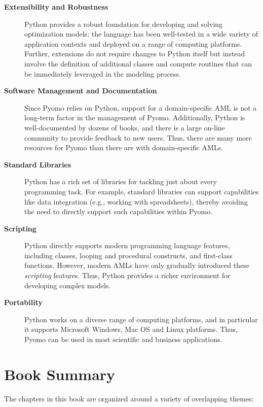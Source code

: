 \begin{description}

\item[{\bf Extensibility and Robustness}] Python provides a robust
foundation for developing and solving optimization models: the language
has been well-tested in a wide variety of application contexts and
deployed on a range of computing platforms. Further, extensions do not
require changes to Python itself but instead involve the definition of
additional classes and compute routines that can be immediately leveraged
in the modeling process.

\item[{\bf Software Management and Documentation}] Since Pyomo relies
on Python, support for a domain-specific AML is not a long-term factor
in the management of Pyomo.  Additionally, Python is well-documented
by dozens of books, and there is a large on-line community to provide
feedback to new users.  Thus, there are many more resources for Pyomo
than there are with domain-specific AMLs.

\item[{\bf Standard Libraries}] Python has a rich set of libraries
for tackling just about every programming task. For example, standard
libraries can support capabilities like data integration (e.g., working
with spreadsheets), thereby avoiding the need to directly support such
capabilities within Pyomo.

\item[{\bf Scripting}] Python directly supports modern programming
language features, including classes, looping and procedural constructs,
and first-class functions.  However, modern AMLs have only gradually
introduced these {\em scripting} features.  Thus, Python provides a
richer environment for developing complex models.

\item[{\bf Portability}] Python works on a diverse range of computing
platforms, and in particular it supports Microsoft Windows, Mac OS
and Linux platforms.  Thus, Pyomo can be used in most scientific and
business applications.

\end{description}

\section{Book Summary}

The chapters in this book are organized around a variety of overlapping themes:

